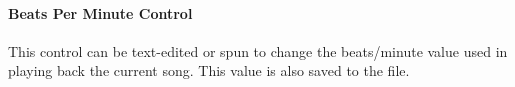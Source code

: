\documentclass[
 11pt,
 twoside,
 a4paper,
 headinclude,
 footinclude,
 final                                 %
]{article}
\begin{document}
\paragraph{Beats Per Minute Control}
\label{paragraph:introduction_bpm_control}

   This control can be text-edited or spun to change the beats/minute value
   used in playing back the current song.  This value is also saved to the
   file.









































\end{document}
